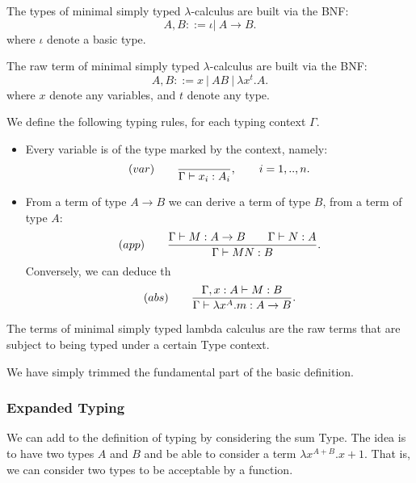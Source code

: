 \begin{definition}
  The types of minimal simply typed $\lambda$-calculus are built via the BNF:
  $$A,B ::= \iota |\ A\to B.$$
  where $\iota$ denote a basic type. 
\end{definition}



\begin{definition}
  The raw term of minimal simply typed $\lambda$-calculus are built via the BNF:
  $$A,B ::= x\ |\ AB\ |\ \lambda x^t.A.$$
  where $x$ denote any variables, and $t$ denote any type. 
\end{definition}



\begin{definition}\label{def:typing-rules}
  We define the following typing rules, for each typing context $\Gamma$.
  \begin{itemize}
  \item Every variable is of the type marked by the context, namely:
    $$  (var)\qquad  {\displaystyle \over \Gamma \vdash x_i:A_i},\qquad  i=  1,..,n.$$

  \item From a term of type $A\to B$ we can derive a term of type $B$, from a term of type $A$:
    $$(app)\qquad  {\displaystyle \Gamma \vdash M:A\to B\qquad \Gamma \vdash N:A      \over \Gamma \vdash MN:B}.$$
    Conversely, we can deduce th
    $$(abs)\qquad  {\displaystyle \Gamma, x: A\vdash M: B  \over \Gamma \vdash \lambda x^A.m:A\to B}.$$
  \end{itemize}
\end{definition}

\begin{definition}
  The terms of minimal simply typed lambda calculus are the raw terms that are subject to being typed under a certain Type context.
\end{definition}
\begin{remark}
  We have simply trimmed the fundamental part of the basic definition.
\end{remark}
\subsubsection{Expanded Typing}
We can add to the definition of typing by considering the sum Type. The idea is to have two types $A$ and $B$ and be able to consider a term $\lambda x^{A+B}. x+1$. That is, we can consider two types to be acceptable by a function. 

